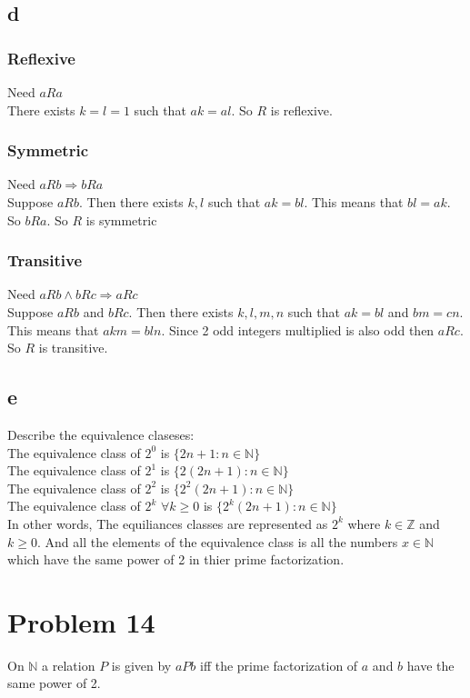 \documentclass{article}
\begin{document}
\subsection*{d}
\subsubsection*{Reflexive}
Need $aRa$\\
There exists $k = l = 1$ such that $ak = al$. So $R$ is reflexive.
\subsubsection*{Symmetric}
Need $aRb \Rightarrow bRa$\\
Suppose $aRb$. Then there exists $k, l$ such that $ak = bl$. This means that $bl = ak$. So $bRa$. So $R$ is symmetric
\subsubsection*{Transitive}
Need $aRb \land bRc \Rightarrow aRc$\\
Suppose $aRb$ and $bRc$. Then there exists $k, l, m, n$ such that $ak = bl$ and $bm = cn$. This means that $akm = bln$. Since 2 odd integers multiplied is also odd then $aRc$. So $R$ is transitive.
\subsection*{e}
Describe the equivalence claseses:\\
The equivalence class of $2^0$ is $\{2n+1: n \in \mathbb{N}\}$\\
The equivalence class of $2^1$ is $\{2(2n+1): n \in \mathbb{N}\}$\\
The equivalence class of $2^2$ is $\{2^2(2n+1): n \in \mathbb{N}\}$\\
The equivalence class of $2^k$ $\forall k \geq 0$ is $\{2^k(2n+1): n \in \mathbb{N}\}$\\
In other words, The equiliances classes are represented as $2^k$ where $k \in \mathbb{Z}$ and $k \geq 0$. And all the elements of the equivalence class is all the numbers $x \in \mathbb{N}$ which have the same power of 2 in thier prime factorization.\\


\section*{Problem 14}
On $\mathbb{N}$ a relation $P$ is given by $aPb$ iff the prime factorization of $a$  and $b$ have the same power of 2. 
\end{document}
